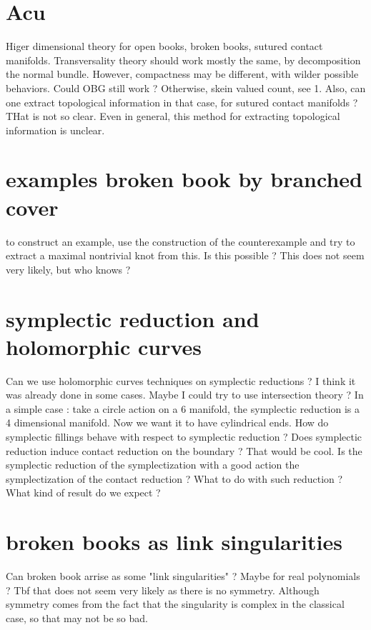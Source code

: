 \documentclass[a4paper,11pt]{article}
\begin{document}
\section{Acu}
Higer dimensional theory for open books, broken books, sutured contact manifolds. 
Transversality theory should work mostly the same, by decomposition the normal bundle. 
However, compactness may be different, with wilder possible behaviors. Could OBG still work ?
Otherwise, skein valued count, see 1. Also, can one extract topological information in that case, for sutured contact manifolds ?
THat is not so clear. Even in general, this method for extracting topological information is unclear. 

\section{examples broken book by branched cover}
to construct an example, use the construction of the counterexample and try to extract a maximal nontrivial knot from this.
Is this possible ? This does not seem very likely, but who knows ?

\section{symplectic reduction and holomorphic curves}

Can we use holomorphic curves techniques on symplectic reductions ? I think it was already done in some cases. 
Maybe I could try to use intersection theory ? 
In a simple case : take a circle action on a 6 manifold, the symplectic reduction is a 
4 dimensional manifold. Now we want it to have cylindrical ends. 
How do symplectic fillings behave with respect to symplectic reduction ? Does symplectic reduction induce contact reduction on the boundary ?
That would be cool. Is the symplectic reduction of the symplectization with a good action the symplectization of the contact reduction ?
What to do with such reduction ? What kind of result do we expect ?


\section{broken books as link singularities}

Can broken book arrise as some "link singularities" ? Maybe for real polynomials ?
Tbf that does not seem very likely as there is no symmetry. Although symmetry comes from 
the fact that the singularity is complex in the classical case, so that may not be so bad.
\end{document}
